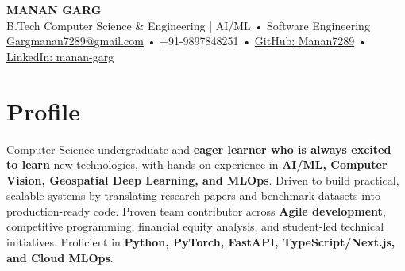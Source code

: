 \documentclass[10pt,a4paper]{article}
\begin{document}
\begin{center}
    {\Huge \bfseries MANAN GARG} \\[4pt]
    {\large B.Tech Computer Science \& Engineering | AI/ML • Software Engineering} \\[4pt]
    \small 
    \href{mailto:Gargmanan7289@gmail.com}{Gargmanan7289@gmail.com} • 
    +91-9897848251 • 
    \href{https://github.com/Manan7289}{GitHub: Manan7289} • 
    \href{https://linkedin.com/in/manan-garg-85012b318}{LinkedIn: manan-garg}
\end{center}

\vspace{10pt}

\section*{Profile}
Computer Science undergraduate and \textbf{eager learner who is always excited to learn} new technologies, with hands-on experience in \textbf{AI/ML, Computer Vision, Geospatial Deep Learning, and MLOps}. Driven to build practical, scalable systems by translating research papers and benchmark datasets into production-ready code. Proven team contributor across \textbf{Agile development}, competitive programming, financial equity analysis, and student-led technical initiatives. Proficient in \textbf{Python, PyTorch, FastAPI, TypeScript/Next.js, and Cloud MLOps}.

\vspace{12pt}
\end{document}
